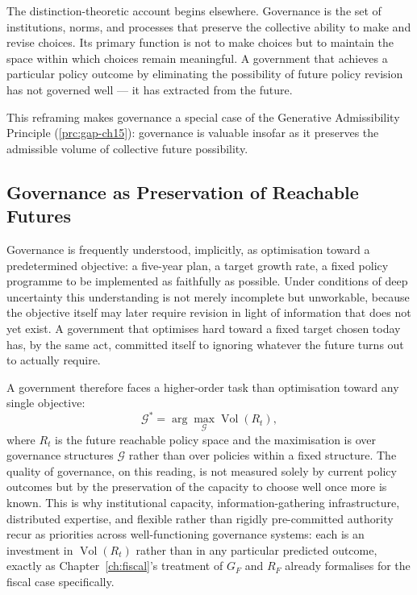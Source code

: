 \documentclass[12pt,twoside,openright]{book}
\newcommand{\Vol}{\operatorname{Vol}}
\begin{document}
The distinction-theoretic account begins elsewhere.
Governance is the set of institutions, norms, and
processes that preserve the collective ability to make
and revise choices. Its primary function is not to
make choices but to maintain the space within which
choices remain meaningful. A government that achieves
a particular policy outcome by eliminating the
possibility of future policy revision has not governed
well — it has extracted from the future.

This reframing makes governance a special case of
the Generative Admissibility Principle
(\cref{prc:gap-ch15}): governance is valuable insofar
as it preserves the admissible volume of collective
future possibility.

\subsection{Governance as Preservation of Reachable Futures}
\label{sec:ch28-preservation}

Governance is frequently understood, implicitly, as
optimisation toward a predetermined objective: a five-year
plan, a target growth rate, a fixed policy programme to be
implemented as faithfully as possible. Under conditions of
deep uncertainty this understanding is not merely incomplete
but unworkable, because the objective itself may later
require revision in light of information that does not yet
exist. A government that optimises hard toward a fixed target
chosen today has, by the same act, committed itself to
ignoring whatever the future turns out to actually require.

A government therefore faces a higher-order task than
optimisation toward any single objective:
\[
  \mathcal{G}^* = \arg\max_{\mathcal{G}} \Vol(R_t),
\]
where $R_t$ is the future reachable policy space and the
maximisation is over governance structures $\mathcal{G}$
rather than over policies within a fixed structure. The
quality of governance, on this reading, is not measured
solely by current policy outcomes but by the preservation of
the capacity to choose well once more is known. This is why
institutional capacity, information-gathering infrastructure,
distributed expertise, and flexible rather than rigidly
pre-committed authority recur as priorities across
well-functioning governance systems: each is an investment in
$\Vol(R_t)$ rather than in any particular predicted outcome,
exactly as Chapter~\ref{ch:fiscal}'s treatment of $G_F$ and
$R_F$ already formalises for the fiscal case specifically.
\end{document}
